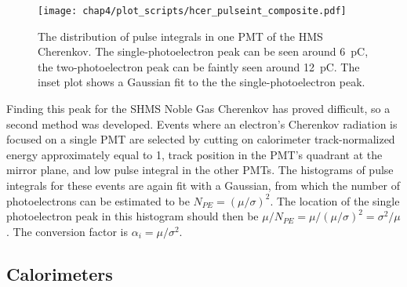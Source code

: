\begin{figure}[!h]
    \centering
    \texttt{[image: chap4/plot\_scripts/hcer\_pulseint\_composite.pdf]}
    \caption[The distribution of pulse integrals in one PMT of the HMS
            Cherenkov.]{
            The distribution of pulse integrals in one PMT of the HMS
            Cherenkov.
            The single-photoelectron peak can be seen around
            \SI{6}{\pico\coulomb}, the two-photoelectron peak can be faintly
            seen around \SI{12}{\pico\coulomb}.
            The inset plot shows a Gaussian fit to the the single-photoelectron
            peak.
            }
    \label{fig:normalized_edep}
\end{figure}

Finding this peak for the SHMS Noble Gas Cherenkov has proved difficult, so a
second method was developed.
Events where an electron's Cherenkov radiation is focused on a single PMT are
selected by cutting on
calorimeter track-normalized energy approximately equal to 1,
track position in the PMT's quadrant at the mirror plane,
and low pulse integral in the other PMTs.
The histograms of pulse integrals for these events are again fit with a
Gaussian, from which the number of photoelectrons can be estimated to be
$N_{PE}=(\mu/\sigma)^2$.
The location of the single photoelectron peak in this histogram should then
be $\mu/N_{PE}=\mu/(\mu/\sigma)^2=\sigma^2/\mu$.
The conversion factor is $\alpha_i=\mu/\sigma^2$.


\subsection{Calorimeters}


%


